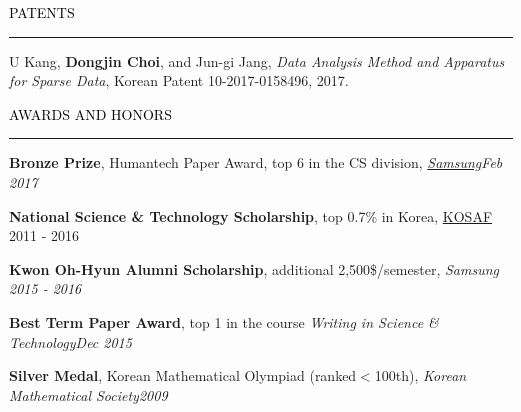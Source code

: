 \documentclass{resume} %
\renewenvironment{rSection}[1]{
	\sectionskip
	\textcolor{Black}{\MakeUppercase{#1}}
	\sectionlineskip
	\hrule
	\begin{list}{}{
			\setlength{\leftmargin}{1.5em}
		}
		\item[]
	}{
	\end{list}
}
\begin{document}

\begin{rSection}{Patents}
	\begin{rSubsection}{}{}{}{}
		\vspace*{-3.5mm}
		\item U Kang, \textbf{Dongjin Choi}, and Jun-gi Jang, \textit{Data Analysis Method and Apparatus for Sparse Data}, Korean Patent 10-2017-0158496, 2017.
	\end{rSubsection}
	
\end{rSection}
\vspace*{-5mm}


\begin{rSection}{Awards and Honors}
	\begin{rSubsection}{}{}{}{}
		\vspace*{-3.5mm}
		\item \textbf{Bronze Prize}, Humantech Paper Award, top 6 in the CS division, \em{\href{https://humantech.samsung.com/saitext/index.jsp}{Samsung}}\em \hfill Feb 2017
		
		\item \textbf{National Science \& Technology Scholarship}, top 0.7\% in Korea, \href{http://www.kosaf.go.kr/}{KOSAF} \hfill 2011 - 2016
		
		\item \textbf{Kwon Oh-Hyun Alumni Scholarship}, additional 2,500\$/semester, \em Samsung \em \hfill 2015 - 2016
		
		\item \textbf{Best Term Paper Award}, top 1 in the course \em Writing in Science \& Technology\em \hfill Dec 2015

		\item \textbf{Silver Medal}, Korean Mathematical Olympiad (ranked$<$100th), \em Korean Mathematical Society\em \hfill 2009
		
	\end{rSubsection}

\end{rSection}
\vspace{-4mm}
\end{document}

